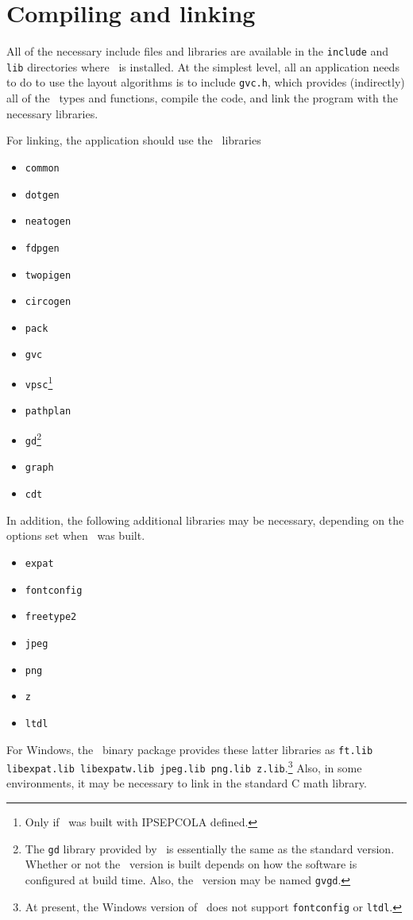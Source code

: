 \section{Compiling and linking}
\label{sec:build}
All of the necessary include files and libraries are available
in the {\tt include} and {\tt lib} directories where \gviz\
is installed. At the simplest level, all an application needs
to do to use the layout algorithms is to include {\tt gvc.h},
which provides (indirectly) all of the \gviz\ types and functions,
compile the code,
and link the program with the necessary libraries.

For linking, the application should use the \gviz\ libraries 
\begin{itemize}
\item {\tt common}
\item {\tt dotgen}
\item {\tt neatogen}
\item {\tt fdpgen}
\item {\tt twopigen}
\item {\tt circogen}
\item {\tt pack}
\item {\tt gvc}
\item {\tt vpsc}\footnote{
Only if \gviz\ was built with IPSEPCOLA defined.}
\item {\tt pathplan}
\item {\tt gd}\footnote{
The {\tt gd} library provided by \gviz\ is essentially
the same as the standard version. Whether or not the \gviz\ version is built
depends on how the software is configured at build time. Also, the \gviz\
version may be named {\tt gvgd}.
}
\item {\tt graph}
\item {\tt cdt}
\end{itemize}
In addition, the following additional libraries may be necessary, depending
on the options set when \gviz\ was built.
\begin{itemize}
\item {\tt expat}
\item {\tt fontconfig}
\item {\tt freetype2}
\item {\tt jpeg}
\item {\tt png}
\item {\tt z}
\item {\tt ltdl}
\end{itemize}
For Windows, the \gviz\ binary package provides these latter libraries as
{\tt ft.lib libexpat.lib libexpatw.lib jpeg.lib png.lib z.lib}.\footnote{
At present, the Windows version of \gviz\ does not support {\tt fontconfig}
or {\tt ltdl}.}
Also, in some environments, it may be necessary to link
in the standard C math library.

